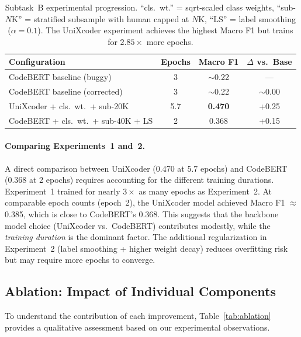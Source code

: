 \documentclass[11pt]{article}
\begin{document}
\begin{table}[htbp]
\centering
\footnotesize
\begin{tabularx}{\columnwidth}{@{}X c c c@{}}
\toprule
\textbf{Configuration} & \textbf{Epochs} & \textbf{Macro F1} & \textbf{$\Delta$ vs.\ Base} \\ \midrule
CodeBERT baseline (buggy) & 3 & $\sim$0.22 & --- \\
CodeBERT baseline (corrected) & 3 & $\sim$0.22 & $\sim$0.00 \\
UniXcoder + cls.\ wt.\ + sub-20K & 5.7 & \textbf{0.470} & +0.25 \\
CodeBERT + cls.\ wt.\ + sub-40K + LS & 2 & 0.368 & +0.15 \\
\bottomrule
\end{tabularx}
\caption{Subtask~B experimental progression. ``cls.\ wt.'' = sqrt-scaled class weights, ``sub-$N$K'' = stratified subsample with human capped at $N$K, ``LS'' = label smoothing ($\alpha = 0.1$). The UniXcoder experiment achieves the highest Macro F1 but trains for $2.85\times$ more epochs.}
\label{tab:taskB_comparison}
\end{table}

\paragraph{Comparing Experiments~1 and~2.}
A direct comparison between UniXcoder (0.470 at 5.7 epochs) and CodeBERT (0.368 at 2 epochs) requires accounting for the different training durations. Experiment~1 trained for nearly $3\times$ as many epochs as Experiment~2. At comparable epoch counts (epoch~2), the UniXcoder model achieved Macro F1 $\approx$ 0.385, which is close to CodeBERT's 0.368. This suggests that the backbone model choice (UniXcoder vs.\ CodeBERT) contributes modestly, while the \textit{training duration} is the dominant factor. The additional regularization in Experiment~2 (label smoothing + higher weight decay) reduces overfitting risk but may require more epochs to converge.

\subsection{Ablation: Impact of Individual Components}

To understand the contribution of each improvement, Table~\ref{tab:ablation} provides a qualitative assessment based on our experimental observations.
\end{document}

